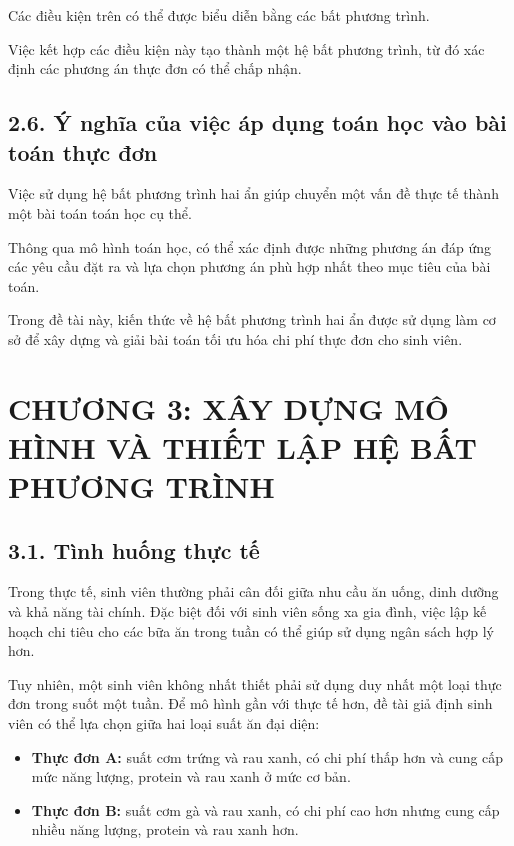 \documentclass[12pt,a4paper]{article}
\begin{document}
Các điều kiện trên có thể được biểu diễn bằng các bất phương trình.

Việc kết hợp các điều kiện này tạo thành một hệ bất phương trình, từ đó xác định các phương án thực đơn có thể chấp nhận.

\subsection*{2.6. Ý nghĩa của việc áp dụng toán học vào bài toán thực đơn}

Việc sử dụng hệ bất phương trình hai ẩn giúp chuyển một vấn đề thực tế thành một bài toán toán học cụ thể.

Thông qua mô hình toán học, có thể xác định được những phương án đáp ứng các yêu cầu đặt ra và lựa chọn phương án phù hợp nhất theo mục tiêu của bài toán.

Trong đề tài này, kiến thức về hệ bất phương trình hai ẩn được sử dụng làm cơ sở để xây dựng và giải bài toán tối ưu hóa chi phí thực đơn cho sinh viên.



\newpage

\section*{CHƯƠNG 3: XÂY DỰNG MÔ HÌNH VÀ THIẾT LẬP HỆ BẤT PHƯƠNG TRÌNH}

\subsection*{3.1. Tình huống thực tế}

Trong thực tế, sinh viên thường phải cân đối giữa nhu cầu ăn uống, dinh dưỡng và khả năng tài chính. Đặc biệt đối với sinh viên sống xa gia đình, việc lập kế hoạch chi tiêu cho các bữa ăn trong tuần có thể giúp sử dụng ngân sách hợp lý hơn.

Tuy nhiên, một sinh viên không nhất thiết phải sử dụng duy nhất một loại thực đơn trong suốt một tuần. Để mô hình gần với thực tế hơn, đề tài giả định sinh viên có thể lựa chọn giữa hai loại suất ăn đại diện:
\begin{itemize}
    \item \textbf{Thực đơn A:} suất cơm trứng và rau xanh, có chi phí thấp hơn và cung cấp mức năng lượng, protein và rau xanh ở mức cơ bản.
    \item \textbf{Thực đơn B:} suất cơm gà và rau xanh, có chi phí cao hơn nhưng cung cấp nhiều năng lượng, protein và rau xanh hơn.
\end{itemize}
\end{document}
